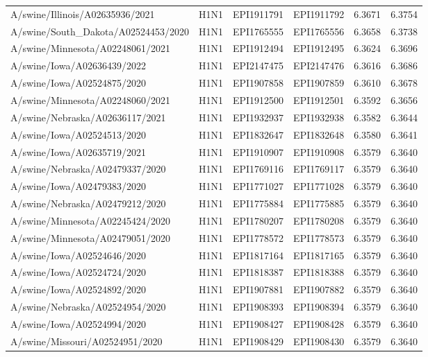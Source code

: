 \begin{tabular}{L{1.95in}|L{.25in}|L{.60in}|L{.6in}|C{1in}|C{1in}}
 A/swine/Illinois/A02635936/2021 &H1N1&EPI1911791&EPI1911792&6.3671&6.3754\\
 A/swine/South\_Dakota/A02524453/2020 &H1N1&EPI1765555&EPI1765556&6.3658&6.3738\\
 A/swine/Minnesota/A02248061/2021 &H1N1&EPI1912494&EPI1912495&6.3624&6.3696\\
 A/swine/Iowa/A02636439/2022 &H1N1&EPI2147475&EPI2147476&6.3616&6.3686\\
 A/swine/Iowa/A02524875/2020 &H1N1&EPI1907858&EPI1907859&6.3610&6.3678\\
 A/swine/Minnesota/A02248060/2021 &H1N1&EPI1912500&EPI1912501&6.3592&6.3656\\
 A/swine/Nebraska/A02636117/2021 &H1N1&EPI1932937&EPI1932938&6.3582&6.3644\\
 A/swine/Iowa/A02524513/2020 &H1N1&EPI1832647&EPI1832648&6.3580&6.3641\\
 A/swine/Iowa/A02635719/2021 &H1N1&EPI1910907&EPI1910908&6.3579&6.3640\\
 A/swine/Nebraska/A02479337/2020 &H1N1&EPI1769116&EPI1769117&6.3579&6.3640\\
 A/swine/Iowa/A02479383/2020 &H1N1&EPI1771027&EPI1771028&6.3579&6.3640\\
 A/swine/Nebraska/A02479212/2020 &H1N1&EPI1775884&EPI1775885&6.3579&6.3640\\
 A/swine/Minnesota/A02245424/2020 &H1N1&EPI1780207&EPI1780208&6.3579&6.3640\\
 A/swine/Minnesota/A02479051/2020 &H1N1&EPI1778572&EPI1778573&6.3579&6.3640\\
 A/swine/Iowa/A02524646/2020 &H1N1&EPI1817164&EPI1817165&6.3579&6.3640\\
 A/swine/Iowa/A02524724/2020 &H1N1&EPI1818387&EPI1818388&6.3579&6.3640\\
 A/swine/Iowa/A02524892/2020 &H1N1&EPI1907881&EPI1907882&6.3579&6.3640\\
 A/swine/Nebraska/A02524954/2020 &H1N1&EPI1908393&EPI1908394&6.3579&6.3640\\
 A/swine/Iowa/A02524994/2020 &H1N1&EPI1908427&EPI1908428&6.3579&6.3640\\
 A/swine/Missouri/A02524951/2020 &H1N1&EPI1908429&EPI1908430&6.3579&6.3640\\

\end{tabular}
